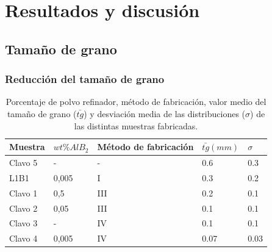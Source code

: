 \documentclass[a4paper,12pt,fleqn,twoside,openany]{book}
\begin{document}

\chapter{Resultados y discusión}



\section{Tamaño de grano}


\subsection{Reducción del tamaño de grano}

\begin{table} 
\begin{center} 
\begin{tabular}{@{}lllll@{}} \toprule
Muestra & $wt \% AlB_2$ & Método de fabricación & $\bar{tg} (mm)$ & $\sigma$ \\ \midrule
 Clavo 5 &  -   & - & 0.6 & 0.3   \\
 L1B1    &  0,005 & I   & 0.3 & 0.2  \\
 Clavo 1 &  0,5   & III & 0.2 & 0.1   \\
 Clavo 2 &  0,05  & III & 0.1 & 0.1   \\
 Clavo 3 &  -     & IV  & 0.1   & 0.1   \\
 Clavo 4 &  0,005 & IV  & 0.07 & 0.03   \\
\bottomrule
\end{tabular}



\caption{Porcentaje de polvo refinador, método de fabricación, valor medio del tamaño de grano ($\bar{tg}$) y desviación media de las distribuciones ($\sigma$) de las distintas muestras fabricadas.}
\label{tab:ResClavos}
\end{center}
\end{table}
\end{document}
